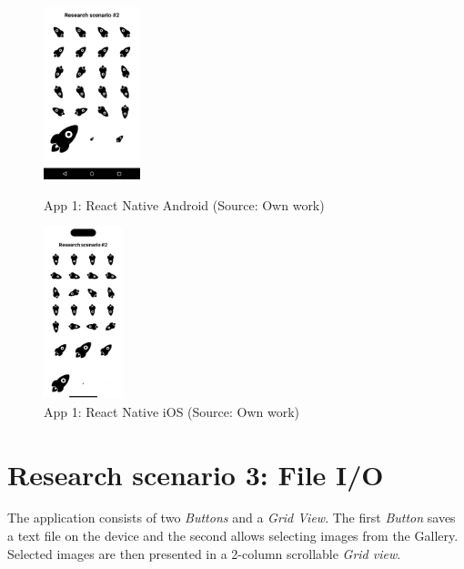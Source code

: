 \begin{figure}[H]
\begin{minipage}{.47\textwidth}
  \centering
  \includegraphics[height=50mm]{img/app2_rn_android}
  \caption{App 1: React Native Android (Source: Own work)}
  \label{fig:app2_rn_android}
\end{minipage}
\hfill
\begin{minipage}{.47\textwidth}
  \centering
  \includegraphics[height=50mm]{img/app2_rn_ios}
  \caption{App 1: React Native iOS (Source: Own work)}
  \label{fig:app2_rn_ios}
\end{minipage}
\end{figure}

\section{Research scenario 3: File I/O}

The application consists of two \emph{Buttons} and a \emph{Grid View}. The first \emph{Button} saves a text file on the device and the second allows selecting images from the Gallery. Selected images are then presented in a 2-column scrollable \emph{Grid view}.

